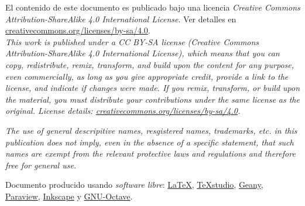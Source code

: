 \vfill
\begin{small}	
	\noindent
	El contenido de este documento es publicado bajo una licencia \textit{Creative Commons Attribution-ShareAlike 4.0 International License}. Ver detalles en
	\href{https://creativecommons.org/licenses/by-sa/4.0/}{creativecommons.org/licenses/by-sa/4.0}.\\
	
	\noindent
\textit{
	This work is published under a CC BY-SA license (\textit{Creative Commons Attribution-ShareAlike 4.0 International License}), which means that you can copy, redistribute, remix, transform, and build upon the content for any purpose, even commercially, as long as you give appropriate credit, provide a link to the license, and indicate if changes were made. If you remix, transform, or build upon the material, you must distribute your contributions under the same license as the original. License details: \href{https://creativecommons.org/licenses/by-sa/4.0/}{creativecommons.org/licenses/by-sa/4.0}.
}
	
	\vspace{2mm}
	
	\noindent
\textit{
	The use of general descripitive names, resgistered names, trademarks, etc. in this publication does not imply, even in the absence of a specific statement, that such names are exempt from the relevant protective laws and regulations and therefore free for general use.
}
	
\end{small}

\vspace{3mm}

\noindent
\begin{footnotesize}
	Documento producido usando \textit{software libre}: \href{https://www.latex-project.org/}{\LaTeX}, \href{https://www.texstudio.org/}{TeXstudio}, \href{https://www.geany.org/}{Geany}, \href{https://www.paraview.org/}{Paraview}, \href{https://inkscape.org/}{Inkscape} y \href{https://www.gnu.org/software/octave/}{GNU-Octave}.
\end{footnotesize}
